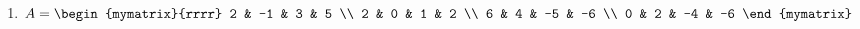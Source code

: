 \begin{enumialphparenastyle}
\begin{ex}
\begin{enumerate}
\item 
$ A = \begin{mymatrix}{rrrr}
2 & -1 & 3 & 5 \\
2 & 0 & 1 & 2 \\
6 & 4 & -5 & -6 \\
0 & 2 & -4 & -6 
\end{mymatrix}$

\end{enumerate}
\end{ex}

\end{enumialphparenastyle}